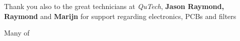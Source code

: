 Thank you also to the great technicians at \textit{QuTech}, \textbf{Jason Raymond, Raymond} and \textbf{Marijn} for support regarding electronics, PCBs and filters 
	
Many of 

%
%
